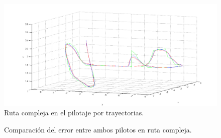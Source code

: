 \begin{figure}[H]
	\begin{center}
		\includegraphics[width=1\textwidth]{imag/IMG41.png}
				\caption{Ruta compleja en el pilotaje por trayectorias.}
		\label{fig:Ruta compleja en trayectoria.}	
	\end{center}
\end{figure}

\begin{figure}[H]
 \centering
 \caption{Comparación del error entre ambos pilotos en ruta compleja.}
 \label{f:Comparativa del error compleja.}
\end{figure} 

